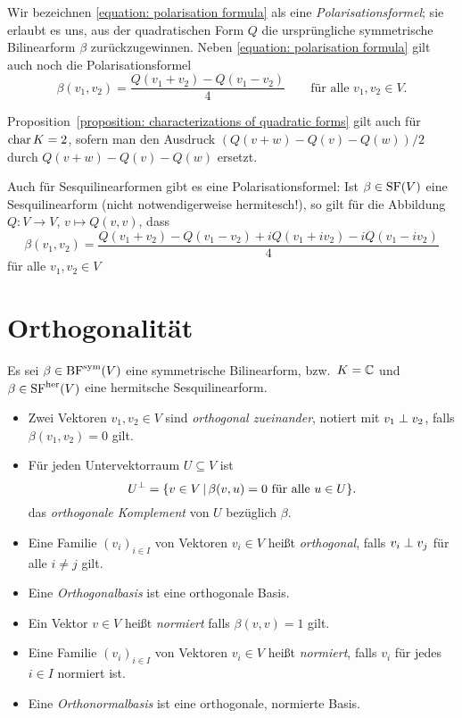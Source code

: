 Wir bezeichnen \eqref{equation: polarisation formula} als eine \emph{Polarisationsformel};
sie erlaubt es uns, aus der quadratischen Form $Q$ die ursprüngliche symmetrische Bilinearform $\beta$ zurückzugewinnen.
Neben \eqref{equation: polarisation formula} gilt auch noch die Polarisationsformel
\[
    \beta(v_1, v_2)
  = \frac{Q(v_1 + v _2) - Q(v_1 - v_2)}{4}
  \qquad
  \text{für alle $v_1, v_2 \in V$}.
\]


\begin{remark}
  Proposition~\ref{proposition: characterizations of quadratic forms} gilt auch für $\operatorname{char} K = 2$, sofern man den Ausdruck $(Q(v+w) - Q(v) - Q(w))/2$ durch $Q(v+w) - Q(v) - Q(w)$ ersetzt.
\end{remark}

Auch für Sesquilinearformen gibt es eine Polarisationsformel:
Ist $\beta \in \operatorname{SF}(V)$ eine Sesquilinearform (nicht notwendigerweise hermitesch!), so gilt für die Abbildung $Q \colon V \to V$, $v \mapsto Q(v,v)$, dass
\[
    \beta(v_1, v_2)
  = \frac{Q(v_1 + v_2) - Q(v_1 - v_2) + i Q(v_1 + i v_2) - i Q(v_1 - i v_2)}{4}
\]
für alle $v_1, v_2 \in V$






\section{Orthogonalität}

Es sei $\beta \in \operatorname{BF}^{\operatorname{sym}}(V)$ eine symmetrische Bilinearform, bzw.\ $K = \mathbb{C}$ und $\beta \in \operatorname{SF}^{\operatorname{her}}(V)$ eine hermitsche Sesquilinearform.

\begin{definition}
  \leavevmode
  \begin{itemize}
    \item
      Zwei Vektoren $v_1, v_2 \in V$ sind \emph{orthogonal zueinander}, notiert mit $v_1 \mathrel{\perp} v_2$, falls $\beta(v_1, v_2) = 0$ gilt.
    \item
      Für jeden Untervektorraum $U \subseteq V$ ist
      \[
          U^\perp
        = \{
            v \in V
          \,|\,
            \text{$\beta(v,u) = 0$ für alle $u \in U$}
          \}.
      \]
      das \emph{orthogonale Komplement} von $U$ bezüglich $\beta$.
    \item
      Eine Familie $(v_i)_{i \in I}$ von Vektoren $v_i \in V$ heißt \emph{orthogonal}, falls $v_i \mathrel{\perp} v_j$ für alle $i \neq j$ gilt.
    \item
      Eine \emph{Orthogonalbasis} ist eine orthogonale Basis.
    \item
      Ein Vektor $v \in V$ heißt \emph{normiert} falls $\beta(v,v) = 1$ gilt.
    \item
      Eine Familie $(v_i)_{i \in I}$ von Vektoren $v_i \in V$ heißt \emph{normiert}, falls $v_i$ für jedes $i \in I$ normiert ist.
    \item
      Eine \emph{Orthonormalbasis} ist eine orthogonale, normierte Basis.
  \end{itemize}
\end{definition}




